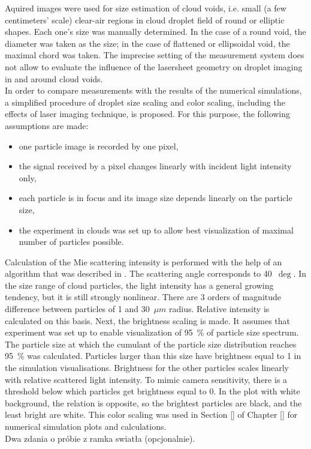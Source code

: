 \documentclass[../main.tex]{subfiles}
\begin{document}
Aquired images were used for size estimation of cloud voids, i.e. small (a few centimeters’ scale) clear-air regions in cloud droplet field of round or elliptic shapes. Each one’s size was manually determined. In the case of a round void, the diameter was taken as the size; in the case of flattened or ellipsoidal void, the maximal chord was taken. The imprecise setting of the measurement system does not allow to evaluate the influence of the lasersheet geometry on droplet imaging in and around cloud voids.  \\
In order to compare measurements with the results of the numerical simulations, a simplified procedure of droplet size scaling and color scaling, including the effects of laser imaging technique, is proposed. For this purpose, the following assumptions are made:
\begin{itemize}
\item one particle image is recorded by one pixel,
\item the signal received by a pixel changes linearly with incident light intensity only,
\item each particle is in focus and its image size depends linearly on the particle size,
\item the experiment in clouds was set up to allow best visualization of maximal number of particles possible.
\end{itemize}
Calculation of the Mie scattering intensity is performed with the help of an algorithm that was described in \citet{Bohren2007}. The scattering angle corresponds to 40~$\deg$. In the size range of cloud particles, the light intensity has a general growing tendency, but it is still strongly nonlinear. There are 3 orders of magnitude difference between particles of 1 and 30~$\mu m$ radius. Relative intensity is calculated on this basis. Next, the brightness scaling is made. It assumes that experiment was set up to enable visualization of 95~\% of particle size spectrum. The particle size at which the cumulant of the particle size distribution reaches 95~\% was calculated. Particles larger than this size have brightness equal to 1 in the simulation visualisations. Brightness for the other particles scales linearly with relative scattered light intensity. To mimic camera sensitivity, there is a threshold below which particles get brightness equal to 0. In the plot with white background, the relation is opposite, so the brightest particles are black, and the least bright are white. This color scaling was used in Section \ref{} of Chapter \ref{} for numerical simulation plots and calculations.\\
Dwa zdania o próbie z ramka swiatła (opcjonalnie).
\end{document}
